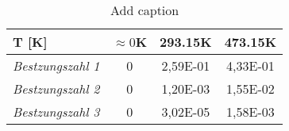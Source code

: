 \begin{table}[htbp]
  \centering
  \caption{Add caption}
    \begin{tabular}{lccc}
    \toprule
    \textbf{T [K]} & \multicolumn{1}{l}{\boldmath{}\textbf{$\approx 0$K}\unboldmath{}} & \multicolumn{1}{l}{\textbf{293.15K}} & \multicolumn{1}{l}{\textbf{473.15K}} \\
    \midrule
    \textit{Bestzungszahl 1} & 0     & 2,59E-01 & 4,33E-01 \\
    \textit{Bestzungszahl 2} & 0     & 1,20E-03 & 1,55E-02 \\
    \textit{Bestzungszahl 3} & 0     & 3,02E-05 & 1,58E-03 \\
    \bottomrule
    \end{tabular}%
  \label{tab:addlabel}%
\end{table}%
